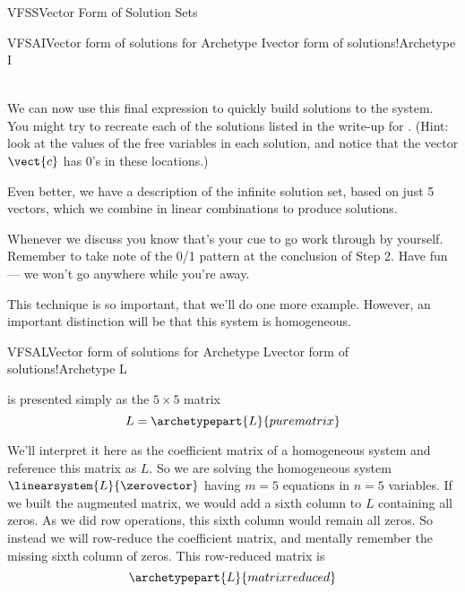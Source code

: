 \begin{subsect}{VFSS}{Vector Form of Solution Sets}
\begin{example}{VFSAI}{Vector form of solutions for Archetype I}{vector form of solutions!Archetype I}
\begin{para}
\begin{align*}
\end{align*}
\end{para}
%
\begin{para}We can now use this final expression to quickly build solutions to the system.  You might try to recreate each of the solutions listed in the write-up for .  (Hint: look at the values of the free variables in each solution, and notice that the vector $\vect{c}$ has 0's in these locations.)\end{para}
%
\begin{para}Even better, we have a description of the infinite solution set, based on just 5 vectors, which we combine in linear combinations to produce solutions.\end{para}
%
\begin{para}Whenever we discuss  you know that's your cue to go work through  by yourself.  Remember to take note of the 0/1 pattern at the conclusion of Step 2.  Have fun --- we won't go anywhere while you're away.\end{para}
%
\end{example}
%
\begin{para}This technique is so important, that we'll do one more example.  However, an important distinction will be that this system is homogeneous.\end{para}
%
\begin{example}{VFSAL}{Vector form of solutions for Archetype L}{vector form of solutions!Archetype L}
\begin{para} is presented simply as the $5\times 5$ matrix
%
\begin{equation*}
L=\archetypepart{L}{purematrix}
\end{equation*}
\end{para}
%
\begin{para}We'll interpret it here as the coefficient matrix of a homogeneous system and reference this matrix as $L$.  So we are solving the homogeneous system $\linearsystem{L}{\zerovector}$ having $m=5$ equations in $n=5$ variables.  If we built the augmented matrix, we would add a sixth column to $L$ containing all zeros.  As we did row operations, this sixth column would remain all zeros.  So instead we will row-reduce the coefficient matrix, and mentally remember the missing sixth column of zeros.  This row-reduced matrix is
%
\begin{equation*}
\archetypepart{L}{matrixreduced}

\end{equation*}
\end{para}
\end{example}
\end{subsect}
